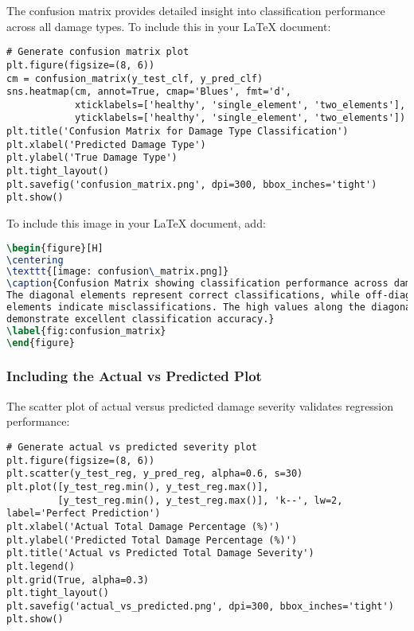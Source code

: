 \documentclass[11pt,a4paper]{article}
\begin{document}
The confusion matrix provides detailed insight into classification performance across all damage types. To include this in your LaTeX document:

\begin{lstlisting}[caption={Confusion Matrix Generation and Inclusion}]
# Generate confusion matrix plot
plt.figure(figsize=(8, 6))
cm = confusion_matrix(y_test_clf, y_pred_clf)
sns.heatmap(cm, annot=True, cmap='Blues', fmt='d', 
            xticklabels=['healthy', 'single_element', 'two_elements'],
            yticklabels=['healthy', 'single_element', 'two_elements'])
plt.title('Confusion Matrix for Damage Type Classification')
plt.xlabel('Predicted Damage Type')
plt.ylabel('True Damage Type')
plt.tight_layout()
plt.savefig('confusion_matrix.png', dpi=300, bbox_inches='tight')
plt.show()
\end{lstlisting}

To include this image in your LaTeX document, add:

\begin{lstlisting}[language=TeX]
\begin{figure}[H]
\centering
\texttt{[image: confusion\_matrix.png]}
\caption{Confusion Matrix showing classification performance across damage types. 
The diagonal elements represent correct classifications, while off-diagonal 
elements indicate misclassifications. The high values along the diagonal 
demonstrate excellent classification accuracy.}
\label{fig:confusion_matrix}
\end{figure}
\end{lstlisting}

\subsubsection{Including the Actual vs Predicted Plot}

The scatter plot of actual versus predicted damage severity validates regression performance:

\begin{lstlisting}[caption={Actual vs Predicted Plot Generation}]
# Generate actual vs predicted severity plot
plt.figure(figsize=(8, 6))
plt.scatter(y_test_reg, y_pred_reg, alpha=0.6, s=30)
plt.plot([y_test_reg.min(), y_test_reg.max()], 
         [y_test_reg.min(), y_test_reg.max()], 'k--', lw=2, label='Perfect Prediction')
plt.xlabel('Actual Total Damage Percentage (%)')
plt.ylabel('Predicted Total Damage Percentage (%)')
plt.title('Actual vs Predicted Total Damage Severity')
plt.legend()
plt.grid(True, alpha=0.3)
plt.tight_layout()
plt.savefig('actual_vs_predicted.png', dpi=300, bbox_inches='tight')
plt.show()
\end{lstlisting}
\end{document}
